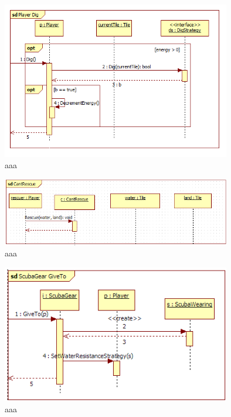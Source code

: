 \begin{figure}[H]
	\begin{center}
		\includegraphics[width=10cm]{chapters/chapter03/seqdiag/Player_Dig.png}
		\caption{aaa}
		\label{bbb}
	\end{center}
\end{figure}
\begin{figure}[H]
	\begin{center}
		\includegraphics[width=10cm]{chapters/chapter03/seqdiag/CantRescue_Rescue.png}
		\caption{aaa}
		\label{bbb}
	\end{center}
\end{figure}
\begin{figure}[H]
	\begin{center}
		\includegraphics[width=10cm]{chapters/chapter03/seqdiag/ScubaGear_GiveTo.png}
		\caption{aaa}
		\label{bbb}
	\end{center}
\end{figure}
